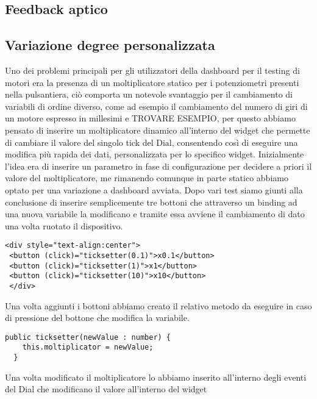 \subsection{Feedback aptico}
\subsection{Variazione degree personalizzata}
Uno dei problemi principali per gli utilizzatori della dashboard per il testing di motori era la presenza di un moltiplicatore statico per i potenziometri presenti nella pulsantiera, ciò comporta un notevole svantaggio per il cambiamento di variabili di ordine diverso, come ad esempio il cambiamento del numero di giri di un motore espresso in millesimi e TROVARE ESEMPIO, per questo abbiamo pensato di inserire un moltiplicatore dinamico all'interno del widget che permette di cambiare il valore del singolo tick del Dial, consentendo così di eseguire una modifica più rapida dei dati, personalizzata per lo specifico widget.
Inizialmente l'idea era di inserire un parametro in fase di configurazione per decidere a priori il valore del moltiplicatore, me rimanendo comunque in parte statico abbiamo optato per una variazione a dashboard avviata.
Dopo vari test siamo giunti alla conclusione di inserire semplicemente tre bottoni che attraverso un binding ad una nuova variabile la modificano e tramite essa avviene il cambiamento di dato una volta ruotato il dispositivo.
\vspace{1.0cm}
\begin{lstlisting}[caption={Aggiunta dei bottoni all'interno del file HTML del componente},style=javaScriptCode]
 <div style="text-align:center">
 <button (click)="ticksetter(0.1)">x0.1</button>
 <button (click)="ticksetter(1)">x1</button>
 <button (click)="ticksetter(10)">x10</button>
 </div>
\end{lstlisting} 
\vspace{1.0cm}
Una volta aggiunti i bottoni abbiamo creato il relativo metodo da eseguire in caso di pressione del bottone che modifica la variabile.
\vspace{1.0cm}
\begin{lstlisting}[caption={Modifica del moltiplicatore},style=javaScriptCode]
public ticksetter(newValue : number) {
    this.moltiplicator = newValue;
  }
\end{lstlisting} 
\vspace{1.0cm}
Una volta modificato il moltiplicatore lo abbiamo inserito all'interno degli eventi del Dial che modificano il valore all'interno del widget
